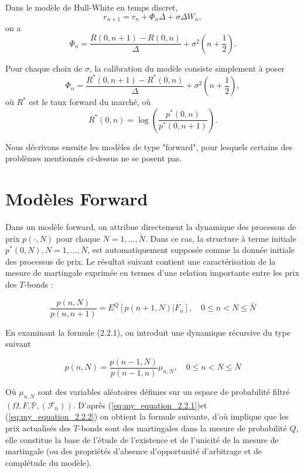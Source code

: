 Dans le modèle de Hull-White en temps discret,
\[
r_{n+1} = r_n + \Phi_n \Delta + \sigma \Delta W_n,
\]
on a 
\[
\Phi_n = \frac{R(0,n+1) - R(0,n)}{\Delta} + \sigma^2 \left(n + \frac{1}{2}\right).
\]

 Pour chaque choix de \(\sigma\), la calibration du modèle consiste simplement à poser
\[
\Phi_n = \frac{R^*(0,n+1) - R^*(0,n)}{\Delta} + \sigma^2 \left(n + \frac{1}{2}\right),
\]
où \(R^*\) est le taux forward du marché, où
\[
R^*(0,n) = \log \left(\frac{p^*(0,n)}{p^*(0,n+1)}\right).
\]


Nous décrivons ensuite les modèles de type "forward", pour lesquels certains des problèmes mentionnés ci-dessus ne se posent pas.
\section{Modèles Forward}

Dans un modèle forward, on attribue directement la dynamique des processus de prix $p(·,N)$ pour chaque $N=1,...,\bar{N}$. Dans ce cas, la structure à terme initiale $p^*(0,N), N = 1,...,\bar{N}$, est automatiquement supposée comme la donnée initiale des processus de prix.
Le résultat suivant contient une caractérisation de la mesure de martingale exprimée en termes d'une relation importante entre les prix des $T$-bonds :

\setcounter{equation}{0}
\renewcommand{\theequation}{\thesection.\arabic{equation}}
\begin{equation}
    \frac{p(n,N)}{p(n,n+1)} = E^Q[p(n+1,N)|F_n], \quad 0 \leq n < N \leq \bar{N}
    \label{eq:my_equation_2.2.1}
\end{equation}


En examinant la formule (2.2.1), on introduit une dynamique récursive du type suivant

\begin{equation}
    p(n,N) = \frac{p(n-1,N)}{p(n-1,n)} \mu_{n,N}, \quad 0 \leq n < N \leq \bar{N}
    \label{eq:my_equation_2.2.2}
\end{equation}


Où $\mu_{n,N}$ sont des variables aléatoires définies sur un espace de probabilité filtré $(\Omega,F,\mathbb{P},(\mathcal{F}_n))$. D'après (\ref{eq:my_equation_2.2.1})et (\ref{eq:my_equation_2.2.2}) on obtient la formule suivante, d'où implique que les prix actualisés des $T$-bonds sont des martingales dans la mesure de probabilité $Q$, elle constitue la base de l'étude de l'existence et de l'unicité de la mesure de martingale (ou des propriétés d'absence d'opportunité d'arbitrage et de complétude du modèle).

